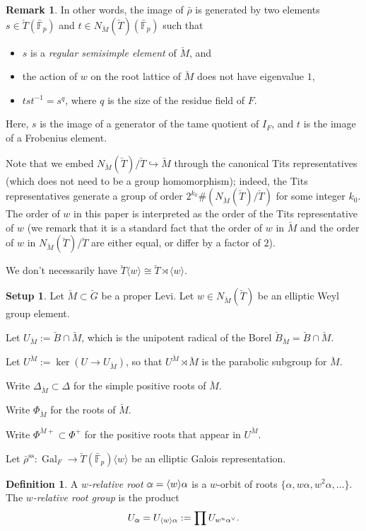 \documentclass[11pt]{amsart}
\newcommand{\MINOREDITED}[1]{#1}
\theoremstyle{definition}
\newtheorem{defn}[thm]{Definition}
\newtheorem{remark}[thm]{Remark}
\newtheorem{setup}[thm]{Setup}
\newcommand{\doublestroke}[1]{\pdfliteral{1 Tr .3 w}#1\pdfliteral{0 Tr 0 w}}
\newcommand{\Balpha}{\doublestroke{\alpha}}
\renewcommand{\SS}{{\operatorname{ss}}}
\newcommand{\bFp}{\bar{\mathbb{F}}_p}
\newcommand{\bG}{\breve{G}}
\newcommand{\bM}{\breve{M}}
\newcommand{\bB}{\breve{B}}
\newcommand{\bT}{\breve{T}}
\DeclareMathOperator{\Gal}{Gal}
\begin{document}
\begin{remark}
In other words,
the image of $\bar\rho$ is generated by two elements
$s\in \bT(\bFp)$ and $t\in N_{\bM}(\bT)(\bFp)$
such that
\begin{itemize}
\item $s$ is a {\it regular semisimple element} of $\bM$, and
\item the action of $w$ on the root lattice of $\bM$ does not have eigenvalue $1$,
\item $t s t^{-1}=s^q$, where $q$ is the size of the residue field of $F$.
\end{itemize}
Here, $s$ is the image of a generator of the tame quotient
of $I_F$,
and $t$ is the image of a Frobenius element.

Note that we embed
$N_{\bM}(\bT)/\bT\hookrightarrow \bM$
through the canonical Tits representatives
(which does not need to be a group homomorphism);
indeed, the Tits representatives \MINOREDITED{generate}
a group of order 
$2^{k_0}\#(N_{\bM}(\bT)/\bT)$ for some integer $k_0$.
The order of $w$ in this paper is interpreted as
the order of the Tits representative of $w$
(we remark that it is a standard fact that the order of
$w$ in $\bM$ and the order of $w$ in $N_{\bM}(\bT)/\bT$
are either equal, or differ by a factor of $2$).

We don't necessarily have
$\bT\langle w\rangle\cong \bT\rtimes \langle w \rangle$.
\end{remark}

\begin{setup}
\label{setup:w}
Let $\bM\subset \bG$ be a proper Levi.
Let $w\in N_{\bM}(\bT)$ be an elliptic Weyl group element.

Let $U_{\bM}:=\bB\cap \bM$, which is the unipotent radical
of the Borel $\bB_{\bM}=\bB\cap \bM$.

Let $U^{\bM}:=\ker(U\to U_{\bM})$,
so that $U^{\bM}\rtimes \bM$ is the parabolic subgroup
for $\bM$.

Write $\Delta_{\bM}\subset \Delta$
for the simple positive roots
of $\bM$.

Write $\Phi_{\bM}$ for the roots of $\bM$.

Write $\Phi^{\bM+}\subset \Phi^+$
for the positive roots
that appear in $U^{\bM}$.

Let $\bar\rho^\SS:\Gal_F\to\bT(\bFp) \langle w\rangle$
be an elliptic Galois representation.
\end{setup}

\begin{defn}
A {\it $w$-relative root}
$\Balpha=\langle w\rangle \alpha$
is a $w$-orbit of roots
$\{\alpha, w \alpha, w^2\alpha, \ldots\}$.
The {\it $w$-relative root group}
is the product
\[
U_{\Balpha}=
U_{\langle w\rangle \alpha}
:=
\prod U_{w^n\alpha^{\vee}}.
\]
\end{defn}
\end{document}
